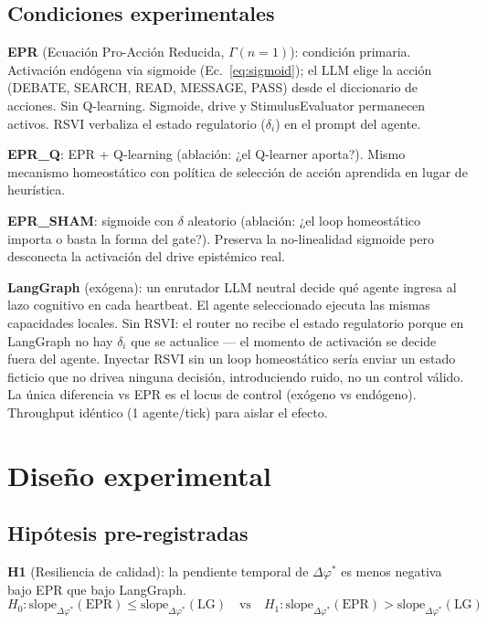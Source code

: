 \documentclass{llncs}
\begin{document}
\subsection{Condiciones experimentales}
\label{sec:conditions}

\textbf{EPR} (Ecuaci\'on Pro-Acci\'on Reducida, $\Gamma(n{=}1)$):
condici\'on primaria. Activaci\'on end\'ogena via sigmoide
(Ec.~\ref{eq:sigmoid}); el LLM elige la acci\'on (DEBATE, SEARCH, READ,
MESSAGE, PASS) desde el diccionario de acciones. Sin Q-learning.
Sigmoide, drive y StimulusEvaluator permanecen activos. RSVI verbaliza
el estado regulatorio ($\delta_i$) en el prompt del agente.

\textbf{EPR\_Q}: EPR + Q-learning (ablaci\'on: ¿el Q-learner aporta?).
Mismo mecanismo homeost\'atico con pol\'itica de selecci\'on de acci\'on
aprendida en lugar de heur\'istica.

\textbf{EPR\_SHAM}: sigmoide con $\delta$ aleatorio (ablaci\'on: ¿el
loop homeost\'atico importa o basta la forma del gate?). Preserva la
no-linealidad sigmoide pero desconecta la activaci\'on del drive
epist\'emico real.

\textbf{LangGraph} (ex\'ogena): un enrutador LLM neutral decide qu\'e
agente ingresa al lazo cognitivo en cada heartbeat. El agente
seleccionado ejecuta las mismas capacidades locales. Sin RSVI: el
router no recibe el estado regulatorio porque en LangGraph no hay
$\delta_i$ que se actualice --- el momento de activaci\'on se decide
fuera del agente. Inyectar RSVI sin un loop homeost\'atico ser\'ia
enviar un estado ficticio que no drivea ninguna decisi\'on, introduciendo
ruido, no un control v\'alido. La \'unica diferencia vs EPR
es el locus de control (ex\'ogeno vs end\'ogeno). Throughput id\'entico
(1 agente/tick) para aislar el efecto.

\section{Dise\~no experimental}
\label{sec:setup}

\subsection{Hip\'otesis pre-registradas}
\label{sec:hypotheses}

\textbf{H1} (Resiliencia de calidad): la pendiente temporal de
$\Delta\varphi^*$ es menos negativa bajo EPR que bajo LangGraph.
\begin{equation*}
    H_0: \text{slope}_{\Delta\varphi^*}(\text{EPR}) \le
          \text{slope}_{\Delta\varphi^*}(\text{LG}) \quad\text{vs}\quad
    H_1: \text{slope}_{\Delta\varphi^*}(\text{EPR}) >
          \text{slope}_{\Delta\varphi^*}(\text{LG})
\end{equation*}
\end{document}
